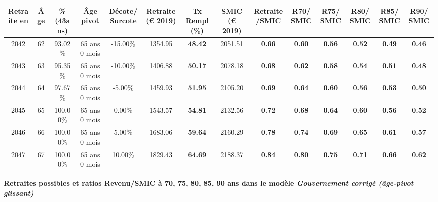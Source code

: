 \begin{adjustbox}{max width=\textwidth} 
\begin{tabular}[htb]{|c|c||c|c|c||c|c||c|c||c|c|c|c|c|} 
\hline 
 Retraite en &  Âge &  \%(43ans) &  Âge pivot &  Décote/Surcote &  Retraite (\euro{} 2019) &  Tx Rempl(\%) &  SMIC (\euro{} 2019) &  Retraite/SMIC &  R70/SMIC &  R75/SMIC &  R80/SMIC &  R85/SMIC &  R90/SMIC \\ 
\hline \hline 
 2042 &  62 &  93.02\% &  65 ans 0 mois &  -15.00\% &  1354.95 &  {\bf 48.42} &  2051.51 &  {\bf {\color{red} 0.66}} &  {\bf {\color{red} 0.60}} &  {\bf {\color{red} 0.56}} &  {\bf {\color{red} 0.52}} &  {\bf {\color{red} 0.49}} &  {\bf {\color{red} 0.46}} \\ 
\hline 
 2043 &  63 &  95.35\% &  65 ans 0 mois &  -10.00\% &  1406.88 &  {\bf 50.17} &  2078.18 &  {\bf {\color{red} 0.68}} &  {\bf {\color{red} 0.62}} &  {\bf {\color{red} 0.58}} &  {\bf {\color{red} 0.54}} &  {\bf {\color{red} 0.51}} &  {\bf {\color{red} 0.48}} \\ 
\hline 
 2044 &  64 &  97.67\% &  65 ans 0 mois &  -5.00\% &  1459.93 &  {\bf 51.95} &  2105.20 &  {\bf {\color{red} 0.69}} &  {\bf {\color{red} 0.64}} &  {\bf {\color{red} 0.60}} &  {\bf {\color{red} 0.56}} &  {\bf {\color{red} 0.53}} &  {\bf {\color{red} 0.50}} \\ 
\hline 
 2045 &  65 &  100.00\% &  65 ans 0 mois &  0.00\% &  1543.57 &  {\bf 54.81} &  2132.56 &  {\bf {\color{red} 0.72}} &  {\bf {\color{red} 0.68}} &  {\bf {\color{red} 0.64}} &  {\bf {\color{red} 0.60}} &  {\bf {\color{red} 0.56}} &  {\bf {\color{red} 0.52}} \\ 
\hline 
 2046 &  66 &  100.00\% &  65 ans 0 mois &  5.00\% &  1683.06 &  {\bf 59.64} &  2160.29 &  {\bf {\color{red} 0.78}} &  {\bf {\color{red} 0.74}} &  {\bf {\color{red} 0.69}} &  {\bf {\color{red} 0.65}} &  {\bf {\color{red} 0.61}} &  {\bf {\color{red} 0.57}} \\ 
\hline 
 2047 &  67 &  100.00\% &  65 ans 0 mois &  10.00\% &  1829.43 &  {\bf 64.69} &  2188.37 &  {\bf {\color{red} 0.84}} &  {\bf {\color{red} 0.80}} &  {\bf {\color{red} 0.75}} &  {\bf {\color{red} 0.71}} &  {\bf {\color{red} 0.66}} &  {\bf {\color{red} 0.62}} \\ 
\hline 
\hline 
\end{tabular} 
\end{adjustbox} 
 
 \vspace{0.1cm} 
{\bf \noindent Retraites possibles et ratios Revenu/SMIC à 70, 75, 80, 85, 90 ans dans le modèle \emph{Gouvernement corrigé (âge-pivot glissant)}}  
 
